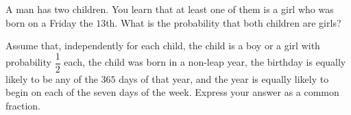 A man has two children. You learn that at least one of them is a girl who was born on a Friday the $13$th. What is the probability that both children are girls?

Assume that, independently for each child, the child is a boy or a girl with probability $\dfrac{1}{2}$ each, the child was born in a non-leap year, the birthday is equally likely to be any of the $365$ days of that year, and the year is equally likely to begin on each of the seven days of the week. Express your answer as a common fraction.
